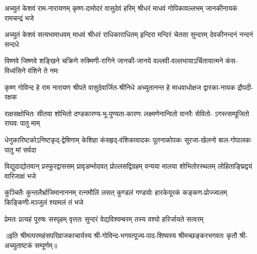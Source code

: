 

\fourlineindentedshloka
{अच्युतं केशवं राम-नारायणम्}
{कृष्ण-दामोदरं वासुदेवं हरिम्}
{श्रीधरं माधवं गोपिकावल्लभम्}
{जानकीनायकं रामचन्द्रं भजे}

\fourlineindentedshloka
{अच्युतं केशवं सत्यभामाधवम्}
{माधवं श्रीधरं राधिकाराधितम्}
{इन्दिरा मन्दिरं चेतसा सुन्दरम्}
{देवकीनन्दनं नन्दनं सन्दधे}

\fourlineindentedshloka
{विष्णवे जिष्णवे शङ्खिने चक्रिणे}
{रुक्मिणी-रागिने जानकी-जानये}
{वल्लवी-वल्लभायाऽर्चितायात्मने}
{कंस-विध्वंसिने वंशिने ते नमः}

\fourlineindentedshloka
{कृष्ण गोविन्द हे राम नारायण}
{श्रीपते वासुदेवार्जित-श्रीनिधे}
{अच्युतानन्त हे माधवाधोक्षज}
{द्वारका-नायक द्रौपदी-रक्षक}

\fourlineindentedshloka
{राक्षसक्षोभितः सीतया शोभितो}
{दण्डकारण्य-भू-पुण्यता-कारणः}
{लक्ष्मणेनान्वितो वानरैः सेवितो-}
{ऽगस्त्सम्पूजितो राघवः पातु माम्}

\fourlineindentedshloka
{धेनुकारिष्टकोऽनिष्टकृद्-द्वेषिणाम्}
{केशिहा कंसहृद्-वंशिकावादकः}
{पूतनाकोपकः सूरजा-खेलनो}
{बाल-गोपालकः पातु मां सर्वदा}

\fourlineindentedshloka
{विद्युदाद्योतवान् प्रस्फुरद्वाससम्}
{प्रावृडम्भोदवत् प्रोल्लसद्विग्रहम्}
{वन्यया मालया शोभितोरस्थलम्}
{लोहिताङ्घ्रिद्वयं वारिजाक्षं भजे}

\fourlineindentedshloka
{कुञ्चितैः कुन्तलैर्भ्राजिमानाननम्}
{रत्नमौलिं लसत् कुण्डलं गण्डयोः}
{हारकेयूरकं कङ्कण-प्रोज्ज्वलम्}
{किङ्किणी-मञ्जुलं श्यामलं तं भजे}

{प्रेमतः प्रत्यहं पूरुषः सस्पृहम्}
{वृत्ततः सुन्दरं वेद्यविश्वम्बरम्}
{तस्य वश्यो हरिर्जायते सत्वरम्}

॥इति श्रीमत्परमहंसपरिव्राजकाचार्यस्य श्री-गोविन्द-भगवत्पूज्य-पाद-शिष्यस्य 
श्रीमच्छङ्करभगवतः कृतौ श्री-अच्युताष्टकं सम्पूर्णम्॥
